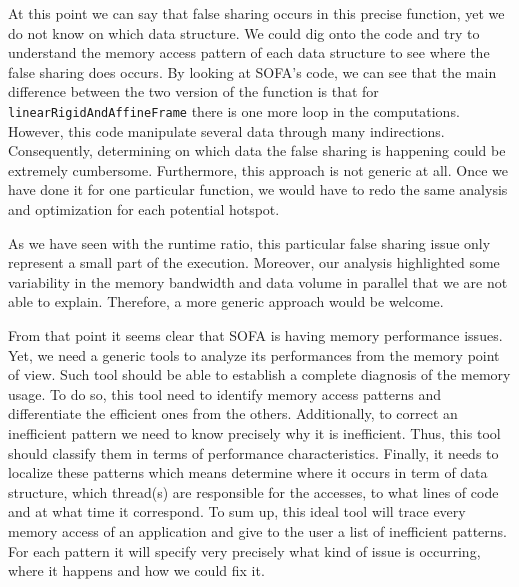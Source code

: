 At this point we can say that false sharing occurs in this precise function, yet we do not know on which data structure.
We could dig onto the code and try to understand the memory access pattern of each data structure to see where the false sharing does occurs.
By looking at \gls{SOFA}'s code, we can see that the main difference between the two version of the function is that for \texttt{linearRigidAndAffineFrame} there is one more loop in the computations.
However, this code manipulate several data through many indirections.
Consequently, determining on which data the false sharing is happening could be extremely cumbersome.
Furthermore, this approach is not generic at all.
Once we have done it for one particular function, we would have to redo the same analysis and optimization for each potential hotspot.

As we have seen with the runtime ratio, this particular false sharing issue only represent a small part of the execution.
Moreover, our analysis highlighted some variability in the memory bandwidth and data volume in parallel that we are not able to explain.
Therefore, a more generic approach would be welcome.

From that point it seems clear that \gls{SOFA} is having memory performance issues.
Yet, we need a generic tools to analyze its performances from the memory point of view.
Such tool should be able to establish a complete diagnosis of the memory usage.
To do so, this tool need to identify memory access patterns and differentiate the efficient ones from the others.
Additionally, to correct an inefficient pattern we need to know precisely why it is inefficient.
Thus, this tool should classify them in terms of performance characteristics.
Finally, it needs to localize these patterns which means determine where it occurs in term of data structure, which thread(s) are responsible for the accesses, to what lines of code and at what time it correspond.
To sum up, this ideal tool will trace every memory access of an application and give to the user a list of inefficient patterns.
For each pattern it will specify very precisely what kind of issue is occurring, where it happens and how we could fix it.


